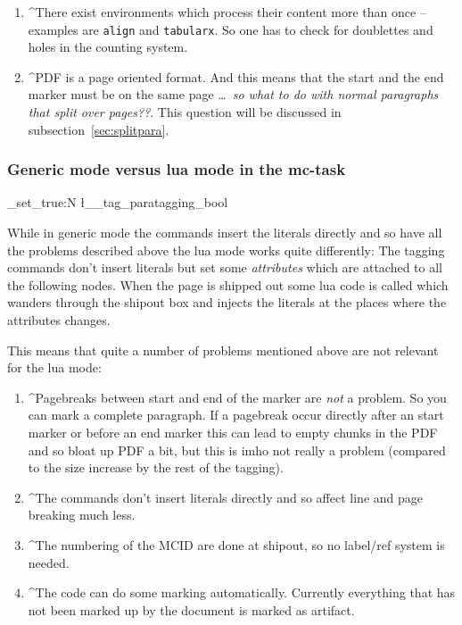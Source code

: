 \documentclass[DIV=12,parskip=half-,bibliography=totoc]{scrartcl}
\newcommand\PDF{PDF}
\newcommand\parataggingON {\bool_set_true:N \l__tag_paratagging_bool}
\begin{document}
\begin{enumerate}[beginpenalty=10000]
  \item
  \TagP^There exist environments which process their content more than once -- examples are \texttt{align} and \texttt{tabularx}.
       So one has to check for doublettes and holes in the counting system.\Pmeti


  \item
  \TagP^\PDF{} is a page oriented format. And this means that the start and the end marker must be on the same page \ldots\ \emph{so what to do with normal paragraphs that split over pages??}. This question will be discussed in subsection~\ref{sec:splitpara}.\Pmeti
\end{enumerate}

\subsubsection{Generic mode versus lua mode in the mc-task}

\parataggingON

While in generic mode the commands insert the literals directly and so have all the problems described above the lua mode works quite differently: The tagging commands don't insert literals but set some \emph{attributes} which are attached to all the following nodes. When the page is shipped out some lua code is called which wanders through the shipout box and injects the literals at the places where the attributes changes.

This means that quite a number of problems mentioned above are not relevant for the lua mode:

\begin{enumerate}
\item \TagP^Pagebreaks between start and end of the marker are \emph{not} a problem. So you can mark a complete paragraph. If a pagebreak occur directly after an start marker or before an end marker this can lead to empty chunks in the \PDF{} and so bloat up \PDF{} a bit, but this is imho not really a problem (compared to the size increase by the rest of the tagging).\Pmeti
\item \TagP^The commands don't insert literals directly and so affect line and page breaking much less.\Pmeti
\item \TagP^The numbering of the MCID are done at shipout, so no label/ref system is needed.\Pmeti
\item \TagP^The code can do some marking automatically. Currently everything that has not been marked up by the document is marked as artifact.\Pmeti
\end{enumerate}
\end{document}
